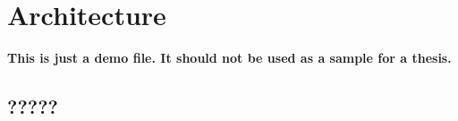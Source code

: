 \chapter{Architecture}
\label{chapter:architecture}

\textbf{This is just a demo file. It should not be used as a sample for a thesis.}\\

\section{?????}
\label{sec:noidea}

